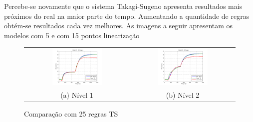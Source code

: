 Percebe-se novamente que o sistema Takagi-Sugeno apresenta resultados mais próximos do real na maior parte do tempo. Aumentando a quantidade de regras obtém-se resultados cada vez melhores. As imagens a seguir apresentam os modelos com 5 e com 15 pontos linearização

\begin{figure}[H]
	\centering
	\begin{tabular}{cc}
		\includegraphics[width=0.5\textwidth,keepaspectratio]{img/h1_ts5_nm.png} &
		\includegraphics[width=0.5\textwidth,keepaspectratio]{img/h2_ts5_nm.png} \\
		(a) Nível 1 &
		(b) Nível 2
	\end{tabular}
	\caption{\label{imgTS5_nm} Comparação com 25 regras TS}
\end{figure}

